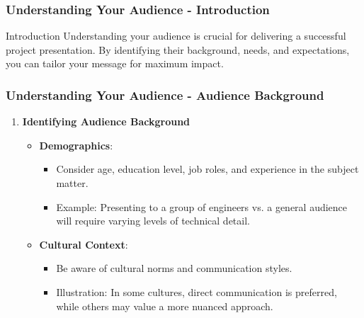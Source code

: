 \documentclass[aspectratio=169]{beamer}
\begin{document}
\begin{frame}[fragile]
    \frametitle{Understanding Your Audience - Introduction}
    \begin{block}{Introduction}
        Understanding your audience is crucial for delivering a successful project presentation. By identifying their background, needs, and expectations, you can tailor your message for maximum impact.
    \end{block}
\end{frame}

\begin{frame}[fragile]
    \frametitle{Understanding Your Audience - Audience Background}
    \begin{enumerate}
        \item \textbf{Identifying Audience Background}
        \begin{itemize}
            \item \textbf{Demographics}: 
                \begin{itemize}
                    \item Consider age, education level, job roles, and experience in the subject matter.
                    \item Example: Presenting to a group of engineers vs. a general audience will require varying levels of technical detail.
                \end{itemize}
            \item \textbf{Cultural Context}:
                \begin{itemize}
                    \item Be aware of cultural norms and communication styles.
                    \item Illustration: In some cultures, direct communication is preferred, while others may value a more nuanced approach.
                \end{itemize}
        \end{itemize}
    \end{enumerate}
\end{frame}
\end{document}
